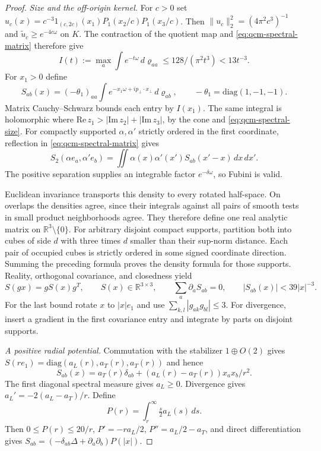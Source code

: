 \documentclass[11pt,letterpaper,reqno]{amsart}
\theoremstyle{definition}
\begin{document}
\begin{proof}
\emph{Size and the off-origin kernel.}
For $c>0$ set
$u_c(x)=c^{-3}1_{(c,2c)}(x_1)P_1(x_2/c)P_1(x_3/c)$.
Then $\|u_c\|_2^2=(4\pi^2c^3)^{-1}$ and
$\widetilde u_c\ge e^{-4c\omega}$ on $K$.
The contraction of the quotient map and \eqref{eq:qcm-spectral-matrix}
therefore give
\begin{equation}\label{eq:qcm-spectral-size}
 I(t):=\max_a\int e^{-t\omega}\,d\varrho_{aa}
 \le128/(\pi^2t^3)<13t^{-3}.
\end{equation}
For $x_1>0$ define
\[
 S_{ab}(x)=(-\theta_1)_{aa}
       \int e^{-x_1\omega+ip_\perp\cdot x_\perp}\,d\varrho_{ab},
 \qquad-\theta_1=\mathrm{diag}(1,-1,-1).
\]
Matrix Cauchy--Schwarz bounds each entry by $I(x_1)$.
The same integral is holomorphic where
$\mathrm{Re}\,z_1>|\mathrm{Im}\,z_2|+|\mathrm{Im}\,z_3|$,
by the cone and \eqref{eq:qcm-spectral-size}.
For compactly supported $\alpha,\alpha'$ strictly ordered in the
first coordinate, reflection in \eqref{eq:qcm-spectral-matrix} gives
\[
 S_2(\alpha e_a,\alpha'e_b)=
 \iint\alpha(x)\alpha'(x')S_{ab}(x'-x)\,dx\,dx'.
\]
The positive separation supplies an integrable factor
$e^{-\delta\omega}$, so Fubini is valid.

Euclidean invariance transports this density to every rotated
half-space. On overlaps the densities agree, since their integrals
against all pairs of smooth tests in small product neighborhoods
agree. They therefore define one real analytic matrix on
$\mathbb R^3\setminus\{0\}$. For arbitrary disjoint compact supports,
partition both into cubes of side $d$ with three times $d$ smaller than
their sup-norm distance. Each pair of occupied cubes is strictly
ordered in some signed coordinate direction. Summing the preceding
formula proves the density formula for those supports.
Reality, orthogonal covariance, and closedness yield
\[
 S(gx)=gS(x)g^T,\qquad S(x)\in\mathbb R^{3\times3},\qquad
 \sum_a\partial_aS_{ab}=0,\qquad |S_{ab}(x)|<39|x|^{-3}.
\]
For the last bound rotate $x$ to $|x|e_1$ and use
$\sum_{k,l}|g_{ak}g_{bl}|\le3$.
For divergence, insert a gradient in the first covariance entry and
integrate by parts on disjoint supports.

\emph{A positive radial potential.}
Commutation with the stabilizer $1\oplus O(2)$ gives
$S(re_1)=\mathrm{diag}(a_L(r),a_T(r),a_T(r))$ and hence
\[
 S_{ab}(x)=a_T(r)\delta_{ab}+(a_L(r)-a_T(r))x_ax_b/r^2.
\]
The first diagonal spectral measure gives $a_L\ge0$.
Divergence gives $a_L'=-2(a_L-a_T)/r$.
Define
\[
 P(r)=\int_r^\infty\tfrac{s}{2}a_L(s)\,ds.
\]
Then $0\le P(r)\le20/r$,
$P'=-ra_L/2$, $P''=a_L/2-a_T$, and direct differentiation gives
$S_{ab}=(-\delta_{ab}\Delta+\partial_a\partial_b)P(|x|)$.


\end{proof}
\end{document}
